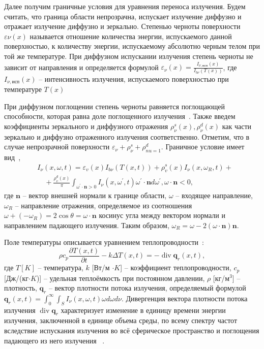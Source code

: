 Далее получим граничные условия для уравнения переноса излучения.
Будем считать, что граница области непрозрачна, испускает излучение диффузно
и отражает излучение диффузно и зеркально.
Степенью черноты поверхности $\varepsilon \nu(x)$ называется отношение количества энергии,
испускаемого данной поверхностью, к количеству энергии, испускаемому абсолютно черным телом при
той же температуре.
При диффузном испускании излучения степень черноты не зависит от направления и определяется формулой
$\varepsilon_\nu(x) = \frac{I_{\nu,\text{исп}}(x)}{I_{b\nu}(T(x))}$, где
$I_{\nu,\text{исп}}(x)$ -- интенсивность излучения, испускаемого
поверхностью при температуре $T(x)$~\cite[53]{Ozisik1976}

При диффузном поглощении степень черноты равняется
поглощающей способности, которая равна доле
поглощенного излучения~\cite[66]{modest2013radiative}.
Также введем коэффициенты зеркального и диффузного отражения
$\rho^s_\nu(x), \rho^d_\nu(x)$ как части зеркально и диффузно отраженного излучения соответственно.
Отметим, что в случае непрозрачной поверхности $\varepsilon_\nu + \rho^s_\nu + \rho^d_{nu = 1}$.
Граничное условие имеет вид~\cite[289]{modest2013radiative},\cite{Kovtanyuk2014a}
\begin{equation}
    \label{eq:1_1:2}
    \begin{aligned}
        &I_\nu(x, \omega, t)=\varepsilon_v(x) I_{b \nu}(T(x, t))
        +\rho_v^s(x) I_\nu\left(x, \omega_R, t\right)+ \\
        &\quad+\frac{\rho_v^d(x)}{\pi} \int_{\omega^{\prime}
        \cdot \mathbf{n}>0} I_\nu\left(x, \omega^{\prime},
        t\right) \omega^{\prime} \cdot \mathbf{n} d \omega^{\prime},
        \omega \cdot \mathbf{n} < 0,
    \end{aligned}
\end{equation}
где $\mathbf{n}$ -- вектор внешней нормали к границе области,
$\omega$ -- входящее направление,
$\omega_R$ -- направление отражения, определяемое из соотношения
$\omega + (-\omega_R) = 2 \cos \theta = \omega \cdot \mathbf{n}$
косинус угла между
вектором нормали и направлением падающего излучения.
Таким образом, $\omega_R = \omega -2(\omega \cdot \mathbf{n})\mathbf{n}$.


Поле температуры описывается уравнением теплопроводности~\cite[297]{modest2013radiative}:
\[
    \rho c_p \frac{\partial T(x, t)}{\partial t} - k \Delta T(x, t)
    = - \operatorname{div} \mathbf{q}_r(x, t),
\]
где $T [K]$ -- температура, $k$ [Вт/м $\cdot K$]
-- коэффициент теплопроводности, $c_p$ [Дж/(кг$\cdot K$)] --
удельная теплоёмкость при постоянном
давлении, $\rho$ [кг/$\text{м}^3$] -- плотность,
$\mathbf{q}_r$ -- вектор плотности потока излучения,
определяемый формулой~\cite[292]{modest2013radiative}
$\mathbf{q}_r(x, t) = \int^\infty_0\int_S I_\nu(x,\omega,t)\omega d\omega d\nu$.
Дивергенция вектора плотности потока излучения $\operatorname{div} \mathbf{q}_r$
характеризует изменение в единицу времени энергии излучения,
заключенной в единице объема среды, по всему спектру частот вследствие испускания
излучения во всё сферическое пространство и поглощения падающего
из него излучения ~\cite[274]{Ozisik1976}.


